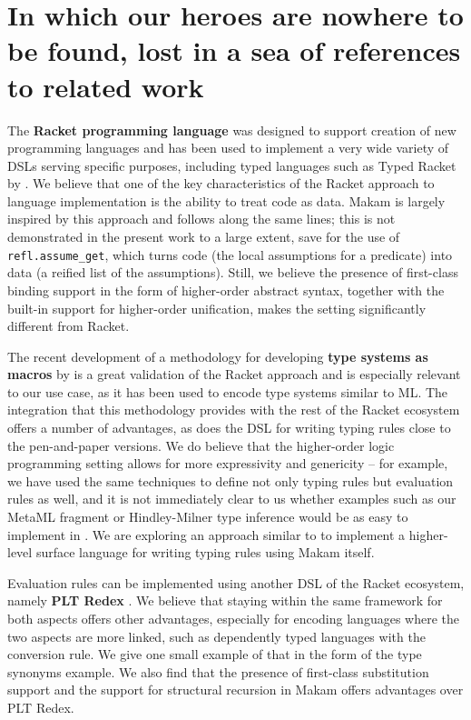 \section{In which our heroes are nowhere to be found, lost in a sea of
references to related
work}\label{in-which-our-heroes-are-nowhere-to-be-found-lost-in-a-sea-of-references-to-related-work}

\identNormal

The \textbf{Racket programming language} was designed to support
creation of new programming languages \citep{racket-manifesto} and has
been used to implement a very wide variety of DSLs serving specific
purposes, including typed languages such as Typed Racket by
\citet{typed-racket-main-reference}. We believe that one of the key
characteristics of the Racket approach to language implementation is the
ability to treat code as data. Makam is largely inspired by this
approach and follows along the same lines; this is not demonstrated in
the present work to a large extent, save for the use of
\texttt{refl.assume\_get}, which turns code (the local assumptions for a
predicate) into data (a reified list of the assumptions). Still, we
believe the presence of first-class binding support in the form of
higher-order abstract syntax, together with the built-in support for
higher-order unification, makes the \lamprolog setting significantly
different from Racket.

The recent development of a methodology for developing \textbf{type
systems as macros} by \citet{racket-type-systems-as-macros} is a great
validation of the Racket approach and is especially relevant to our use
case, as it has been used to encode type systems similar to ML. The
integration that this methodology provides with the rest of the Racket
ecosystem offers a number of advantages, as does the
 DSL for writing typing rules close to the
pen-and-paper versions. We do believe that the higher-order logic
programming setting allows for more expressivity and genericity -- for
example, we have used the same techniques to define not only typing
rules but evaluation rules as well, and it is not immediately clear to
us whether examples such as our MetaML fragment or Hindley-Milner type
inference would be as easy to implement in . We are
exploring an approach similar to  to implement a
higher-level surface language for writing typing rules using Makam
itself.

Evaluation rules can be implemented using another DSL of the Racket
ecosystem, namely \textbf{PLT Redex} \citep{felleisen2009semantics}. We
believe that staying within the same framework for both aspects offers
other advantages, especially for encoding languages where the two
aspects are more linked, such as dependently typed languages with the
conversion rule. We give one small example of that in the form of the
type synonyms example. We also find that the presence of first-class
substitution support and the support for structural recursion in Makam
offers advantages over PLT Redex.

